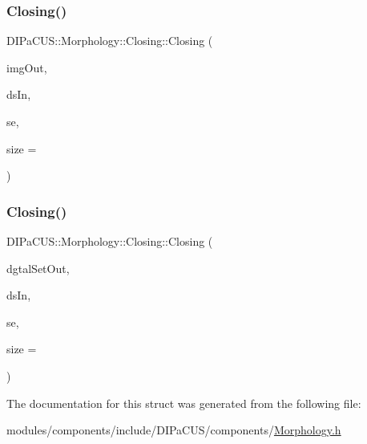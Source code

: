 \subsubsection{\texorpdfstring{Closing()}{Closing()}\hspace{0.1cm}{\footnotesize\ttfamily [1/2]}}
{\footnotesize\ttfamily D\+I\+Pa\+C\+U\+S\+::\+Morphology\+::\+Closing\+::\+Closing (\begin{DoxyParamCaption}\item[{\mbox{\hyperlink{namespaceDIPaCUS_1_1Morphology_a9aff9edf28d681accfc54435fbefcbee}{Image2D}} \&}]{img\+Out,  }\item[{const \mbox{\hyperlink{namespaceDIPaCUS_1_1Morphology_ab69fa725716b0ed4c311c0d00a292be7}{Digital\+Set}} \&}]{ds\+In,  }\item[{\mbox{\hyperlink{namespaceDIPaCUS_1_1Morphology_a60b552d68432e7992f09717070d9c4e7}{Structuring\+Element}}}]{se,  }\item[{int}]{size = {} }\end{DoxyParamCaption})}

\mbox{\label{structDIPaCUS_1_1Morphology_1_1Closing_a21214c86a260cc3afe70193fd857402f}} 
\subsubsection{\texorpdfstring{Closing()}{Closing()}\hspace{0.1cm}{\footnotesize\ttfamily [2/2]}}
{\footnotesize\ttfamily D\+I\+Pa\+C\+U\+S\+::\+Morphology\+::\+Closing\+::\+Closing (\begin{DoxyParamCaption}\item[{\mbox{\hyperlink{namespaceDIPaCUS_1_1Morphology_ab69fa725716b0ed4c311c0d00a292be7}{Digital\+Set}} \&}]{dgtal\+Set\+Out,  }\item[{const \mbox{\hyperlink{namespaceDIPaCUS_1_1Morphology_ab69fa725716b0ed4c311c0d00a292be7}{Digital\+Set}} \&}]{ds\+In,  }\item[{\mbox{\hyperlink{namespaceDIPaCUS_1_1Morphology_a60b552d68432e7992f09717070d9c4e7}{Structuring\+Element}}}]{se,  }\item[{int}]{size = {} }\end{DoxyParamCaption})}



The documentation for this struct was generated from the following file\+:\begin{DoxyCompactItemize}
\item 
modules/components/include/\+D\+I\+Pa\+C\+U\+S/components/\mbox{\hyperlink{Morphology_8h}{Morphology.\+h}}\end{DoxyCompactItemize}
